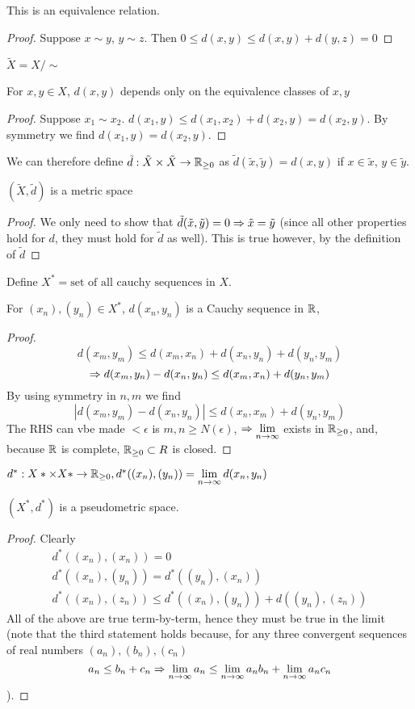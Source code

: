 \begin{lemma}
This is an equivalence relation.
\begin{proof}
Suppose $x\sim y$, $y\sim z$. Then $0\leq d(x,y) \leq d(x,y) + d(y,z)  = 0$
\end{proof} 
\end{lemma}
\begin{mydef} $\tilde{X}=X/\sim$ \end{mydef}
\begin{lemma} For $x,y\in X$, $d(x,y)$ depends only on the equivalence classes of $x,y$
\begin{proof}
Suppose $x_1 \sim x_2$. $d(x_1,y)\leq d(x_1,x_2) + d(x_2,y) = d(x_2,y)$. 
By symmetry we find $d(x_1,y) = d(x_2,y)$.
\end{proof}\end{lemma}
We can therefore define $\tilde{d}: \tilde{X}\times\tilde{X}\to\mathbb{R}_{\geq 0}$ as $\tilde{d}(\tilde{x},\tilde{y}) = d(x,y)$ if $x\in \tilde{x}$, $y\in \tilde{y}$.
\begin{lemma}
$(\tilde{X},\tilde{d})$ is a metric space
\begin{proof}
We only need to show that $\tilde{d}(\tilde{x},\tilde{y})=0 \Rightarrow \tilde{x} = \tilde{y}$ (since all other properties hold for $d$, they must hold for $\tilde{d}$ as well). This is true however, by the definition of $\tilde{d}$
\end{proof}
\end{lemma}
Define $X^*=\text{set of all cauchy sequences in } X$.
\begin{lemma}
For $(x_n),(y_n)\in X^*$, $d(x_n,y_n)$ is a Cauchy sequence in $\mathbb{R}$,
\begin{proof}
\[ d(x_m,y_m)\leq d(x_m, x_n) + d(x_n,y_n) + d(y_n,y_m) \]
\[ \Rightarrow d(x_m,y_n) - d(x_n,y_n) \leq d(x_m,x_n)  + d(y_n,y_m) \]
By using symmetry in $n,m$ we find
\[ |d(x_m,y_m)-d(x_n,y_n)| \leq d(x_n,x_m) + d(y_n,y_m) \]
The RHS can vbe made $<\epsilon$ is $m,n\geq N(\epsilon)$, $\Rightarrow \lim\limits_{n\to\infty}$ exists in $\mathbb{R}_{\geq 0}$, and, because $\mathbb{R}$ is complete, $\mathbb{R}_{\geq 0}\subset R$ is closed.
\end{proof}
\end{lemma}
\begin{mydef}
$d^*: X*\times X*\to\mathbb{R}_{\geq 0}, d^*((x_n),(y_n))=\lim\limits_{n\to\infty} d(x_n,y_n)$
\end{mydef}
\begin{claim}
$(X^*,d^*)$ is a pseudometric space.
\begin{proof}
Clearly
\begin{eqnarray*}
d^*((x_n),(x_n)) = 0\\
d^*((x_n),(y_n)) = d^*((y_n),(x_n)) \\
d^*((x_n),(z_n)) \leq d^*((x_n),(y_n))+d((y_n),(z_n))
\end{eqnarray*}
All of the above are true term-by-term, hence they must be true in the limit (note that the third statement holds because, for any three convergent sequences of real numbers $(a_n),(b_n),(c_n)$
\[ a_n\leq b_n + c_n \Rightarrow \lim\limits_{n\to\infty} a_n \leq \lim\limits_{n\to\infty} a_n b_n + \lim\limits_{n\to\infty} a_n c_n \]
). 
\end{proof}
\end{claim}
